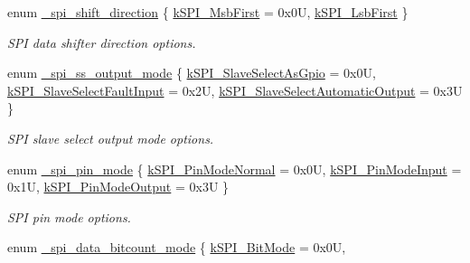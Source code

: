 \begin{DoxyCompactItemize}
enum \mbox{\hyperlink{group__spi__driver_ga1737fd82344e0800f66b541342894b85}{\+\_\+spi\+\_\+shift\+\_\+direction}} \{ \mbox{\hyperlink{group__spi__driver_gga1737fd82344e0800f66b541342894b85ae7b997e8cff761aab865cbd42c4c3989}{k\+S\+P\+I\+\_\+\+Msb\+First}} = 0x0U, 
\mbox{\hyperlink{group__spi__driver_gga1737fd82344e0800f66b541342894b85a20ac53684c3e1ad338553cecbfab94a9}{k\+S\+P\+I\+\_\+\+Lsb\+First}}
 \}
\begin{DoxyCompactList}\small\item\em S\+PI data shifter direction options. \end{DoxyCompactList}\item 
enum \mbox{\hyperlink{group__spi__driver_ga2e815689312c22a94fe0519f7bc0a991}{\+\_\+spi\+\_\+ss\+\_\+output\+\_\+mode}} \{ \mbox{\hyperlink{group__spi__driver_gga2e815689312c22a94fe0519f7bc0a991a3825177650b5d4bfb5dc603f0ce41381}{k\+S\+P\+I\+\_\+\+Slave\+Select\+As\+Gpio}} = 0x0U, 
\mbox{\hyperlink{group__spi__driver_gga2e815689312c22a94fe0519f7bc0a991afdcbdc624d6c2f057147e2aa3cae4635}{k\+S\+P\+I\+\_\+\+Slave\+Select\+Fault\+Input}} = 0x2U, 
\mbox{\hyperlink{group__spi__driver_gga2e815689312c22a94fe0519f7bc0a991ad724fc04589d03b524ef2dfef6b0f4a1}{k\+S\+P\+I\+\_\+\+Slave\+Select\+Automatic\+Output}} = 0x3U
 \}
\begin{DoxyCompactList}\small\item\em S\+PI slave select output mode options. \end{DoxyCompactList}\item 
enum \mbox{\hyperlink{group__spi__driver_ga014ab448d5b79e6cf5b9ffb11c3d0729}{\+\_\+spi\+\_\+pin\+\_\+mode}} \{ \mbox{\hyperlink{group__spi__driver_gga014ab448d5b79e6cf5b9ffb11c3d0729a7ba3d5ffce8458f91a9594e7ffe2b32d}{k\+S\+P\+I\+\_\+\+Pin\+Mode\+Normal}} = 0x0U, 
\mbox{\hyperlink{group__spi__driver_gga014ab448d5b79e6cf5b9ffb11c3d0729ad778c9cc9e3d5a5c4e8061793cf50fdc}{k\+S\+P\+I\+\_\+\+Pin\+Mode\+Input}} = 0x1U, 
\mbox{\hyperlink{group__spi__driver_gga014ab448d5b79e6cf5b9ffb11c3d0729ad5b79c8eba688dbfb4b9973348521de7}{k\+S\+P\+I\+\_\+\+Pin\+Mode\+Output}} = 0x3U
 \}
\begin{DoxyCompactList}\small\item\em S\+PI pin mode options. \end{DoxyCompactList}\item 
enum \mbox{\hyperlink{group__spi__driver_ga1e6f95a831fb9323a32a9676ef049813}{\+\_\+spi\+\_\+data\+\_\+bitcount\+\_\+mode}} \{ \mbox{\hyperlink{group__spi__driver_gga1e6f95a831fb9323a32a9676ef049813a1a0723fd8cd73f361ca2770ad74a6324}{k\+S\+P\+I\+\_\+Bit\+Mode}} = 0x0U, 

\end{DoxyCompactItemize}
